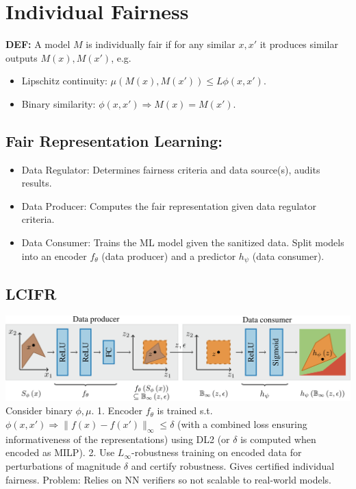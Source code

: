 \section{Individual Fairness}
\textbf{DEF:} A model $M$ is individually fair if for any similar $x,x'$ it produces similar outputs $M(x),M(x')$, e.g.
\begin{itemize}
    \item Lipschitz continuity: $\mu(M(x),M(x'))\le L\phi(x,x')$.
    \item Binary similarity: $\phi(x,x')\Rightarrow M(x)=M(x')$.
\end{itemize}

\subsection*{Fair Representation Learning:}
\begin{itemize}
    \item Data Regulator: Determines fairness criteria and data source(s), audits results.
    \item Data Producer: Computes the fair representation given data regulator criteria.
    \item Data Consumer: Trains the ML model given the sanitized data.
          Split models into an encoder $f_\theta$ (data producer) and a predictor $h_\psi$ (data consumer).
\end{itemize}

\subsection*{LCIFR}
\includegraphics[width=1\columnwidth]{img/lcifr.png}
Consider binary $\phi,\mu$. 1. Encoder $f_\theta$ is trained s.t. $\phi(x, x') \Rightarrow \|f(x) - f(x')\|_\infty \leq \delta$ (with a combined loss ensuring informativeness of the representations) using DL2 (or $\delta$ is computed when encoded as MILP). 2. Use $L_\infty$-robustness training on encoded data for perturbations of magnitude $\delta$ and certify robustness. Gives certified individual fairness. Problem: Relies on NN verifiers so not scalable to real-world models.

